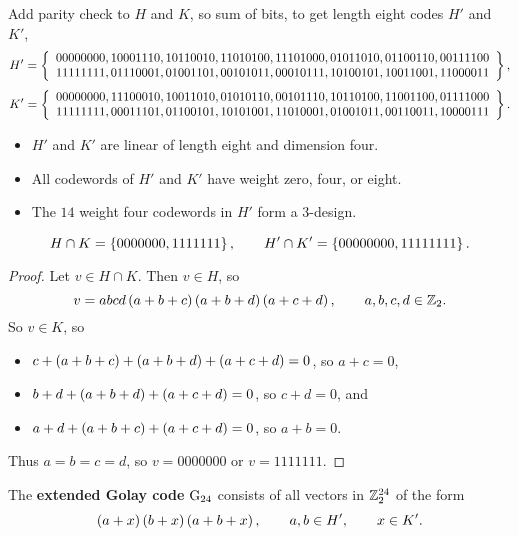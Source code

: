 \pagebreak

Add parity check to $ H $ and $ K $, so sum of bits, to get length eight codes $ H' $ and $ K' $,
$$ H' = \cbr{
\begin{array}{cccccccc}
00000000, 10001110, 10110010, 11010100, 11101000, 01011010, 01100110, 00111100 \\
11111111, 01110001, 01001101, 00101011, 00010111, 10100101, 10011001, 11000011
\end{array}
}, $$
$$ K' = \cbr{
\begin{array}{cccccccc}
00000000, 11100010, 10011010, 01010110, 00101110, 10110100, 11001100, 01111000 \\
11111111, 00011101, 01100101, 10101001, 11010001, 01001011, 00110011, 10000111
\end{array}
}. $$

\begin{note*}
\hfill
\begin{itemize}
\item $ H' $ and $ K' $ are linear of length eight and dimension four.
\item All codewords of $ H' $ and $ K' $ have weight zero, four, or eight.
\item The $ 14 $ weight four codewords in $ H' $ form a $ 3 $-design.
\end{itemize}
\end{note*}

\begin{proposition}
\label{prop:1.13}
$$ H \cap K = \cbr{0000000, 1111111}, \qquad H' \cap K' = \cbr{00000000, 11111111}. $$
\end{proposition}

\begin{proof}
Let $ v \in H \cap K $. Then $ v \in H $, so
$$ v = abcd\br{a + b + c}\br{a + b + d}\br{a + c + d}, \qquad a, b, c, d \in \ZZ_2. $$
So $ v \in K $, so
\begin{itemize}
\item $ c + \br{a + b + c} + \br{a + b + d} + \br{a + c + d} = 0 $, so $ a + c = 0 $,
\item $ b + d + \br{a + b + d} + \br{a + c + d} = 0 $, so $ c + d = 0 $, and
\item $ a + d + \br{a + b + c} + \br{a + c + d} = 0 $, so $ a + b = 0 $.
\end{itemize}
Thus $ a = b = c = d $, so $ v = 0000000 $ or $ v = 1111111 $.
\end{proof}

\begin{definition*}
The \textbf{extended Golay code} $ \mathrm{G}_{24} $ consists of all vectors in $ \mathbb{Z}_2^{24} $ of the form
$$ \br{a + x}\br{b + x}\br{a + b + x}, \qquad a, b \in H', \qquad x \in K'. $$
\end{definition*}

